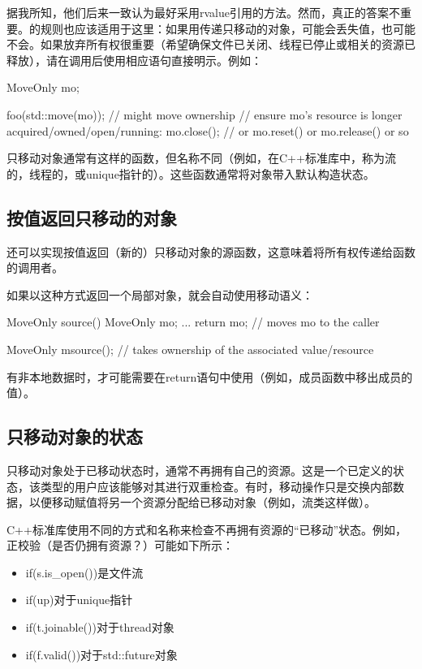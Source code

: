 据我所知，他们后来一致认为最好采用rvalue引用的方法。然而，真正的答案不重要。的规则也应该适用于这里：如果用传递只移动的对象，可能会丢失值，也可能不会。如果放弃所有权很重要（希望确保文件已关闭、线程已停止或相关的资源已释放），请在调用后使用相应语句直接明示。例如：

\begin{cppcode}
MoveOnly mo;

foo(std::move(mo)); // might move ownership
// ensure mo’s resource is longer acquired/owned/open/running:
mo.close(); // or mo.reset() or mo.release() or so
\end{cppcode}

只移动对象通常有这样的函数，但名称不同（例如，在C++标准库中，称为流的，线程的，或unique指针的）。这些函数通常将对象带入默认构造状态。

\subsection{按值返回只移动的对象}

还可以实现按值返回（新的）只移动对象的源函数，这意味着将所有权传递给函数的调用者。

如果以这种方式返回一个局部对象，就会自动使用移动语义：

\begin{cppcode}
MoveOnly source()
{
	MoveOnly mo;
	...
	return mo; // moves mo to the caller
}

MoveOnly m{source()}; // takes ownership of the associated value/resource
\end{cppcode}

有非本地数据时，才可能需要在return语句中使用（例如，成员函数中移出成员的值）。

\subsection{只移动对象的状态}

只移动对象处于已移动状态时，通常不再拥有自己的资源。这是一个已定义的状态，该类型的用户应该能够对其进行双重检查。有时，移动操作只是交换内部数据，以便移动赋值将另一个资源分配给已移动对象（例如，流类这样做）。

C++标准库使用不同的方式和名称来检查不再拥有资源的“已移动”状态。例如，正校验（是否仍拥有资源？）可能如下所示：

\begin{itemize}
	\item if(s.is_open())是文件流
	\item if(up)对于unique指针
	\item if(t.joinable())对于thread对象
	\item if(f.valid())对于std::future对象
\end{itemize}














